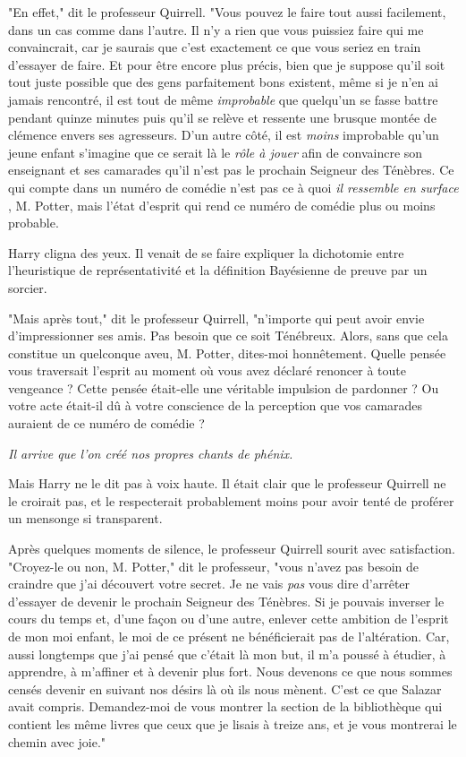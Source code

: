 "En effet," dit le professeur Quirrell. "Vous pouvez le faire tout aussi facilement, dans un cas comme dans l'autre. Il n'y a rien que vous puissiez faire qui me convaincrait, car je saurais que c'est exactement ce que vous seriez en train d'essayer de faire. Et pour être encore plus précis, bien que je suppose qu'il soit tout juste possible que des gens parfaitement bons existent, même si je n'en ai jamais rencontré, il est tout de même \emph{improbable}  que quelqu'un se fasse battre pendant quinze minutes puis qu'il se relève et ressente une brusque montée de clémence envers ses agresseurs. D'un autre côté, il est \emph{moins}  improbable qu'un jeune enfant s'imagine que ce serait là le \emph{rôle à jouer}  afin de convaincre son enseignant et ses camarades qu'il n'est pas le prochain Seigneur des Ténèbres. Ce qui compte dans un numéro de comédie n'est pas ce à quoi \emph{il ressemble en surface} , M. Potter, mais l'état d'esprit qui rend ce numéro de comédie plus ou moins probable.

Harry cligna des yeux. Il venait de se faire expliquer la dichotomie entre l'heuristique de représentativité et la définition Bayésienne de preuve par un sorcier.

"Mais après tout," dit le professeur Quirrell, "n'importe qui peut avoir envie d'impressionner ses amis. Pas besoin que ce soit Ténébreux. Alors, sans que cela constitue un quelconque aveu, M. Potter, dites-moi honnêtement. Quelle pensée vous traversait l'esprit au moment où vous avez déclaré renoncer à toute vengeance ? Cette pensée était-elle une véritable impulsion de pardonner ? Ou votre acte était-il dû à votre conscience de la perception que vos camarades auraient de ce numéro de comédie ?

\emph{Il arrive que l'on créé nos propres chants de phénix.} 

Mais Harry ne le dit pas à voix haute. Il était clair que le professeur Quirrell ne le croirait pas, et le respecterait probablement moins pour avoir tenté de proférer un mensonge si transparent.

Après quelques moments de silence, le professeur Quirrell sourit avec satisfaction. "Croyez-le ou non, M. Potter," dit le professeur, "vous n'avez pas besoin de craindre que j'ai découvert votre secret. Je ne vais \emph{pas}  vous dire d'arrêter d'essayer de devenir le prochain Seigneur des Ténèbres. Si je pouvais inverser le cours du temps et, d'une façon ou d'une autre, enlever cette ambition de l'esprit de mon moi enfant, le moi de ce présent ne bénéficierait pas de l'altération. Car, aussi longtemps que j'ai pensé que c'était là mon but, il m'a poussé à étudier, à apprendre, à m'affiner et à devenir plus fort. Nous devenons ce que nous sommes censés devenir en suivant nos désirs là où ils nous mènent. C'est ce que Salazar avait compris. Demandez-moi de vous montrer la section de la bibliothèque qui contient les même livres que ceux que je lisais à treize ans, et je vous montrerai le chemin avec joie."

